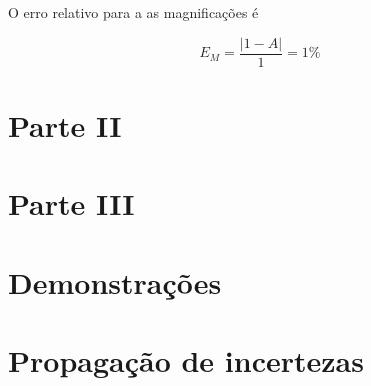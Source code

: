 \documentclass[report,12pt,openright,oneside,a4paper,brazil]{abntex2}
\begin{document}
O erro relativo para a as magnificações é

$$E_M=\frac{|1-A|}{1}=1\%$$

\chapter{Parte II}

\chapter{Parte III}

\newpage
\appendix

\newpage



\nocite{*}

\chapter{Demonstrações}

\chapter{Propagação de incertezas}
\end{document}
